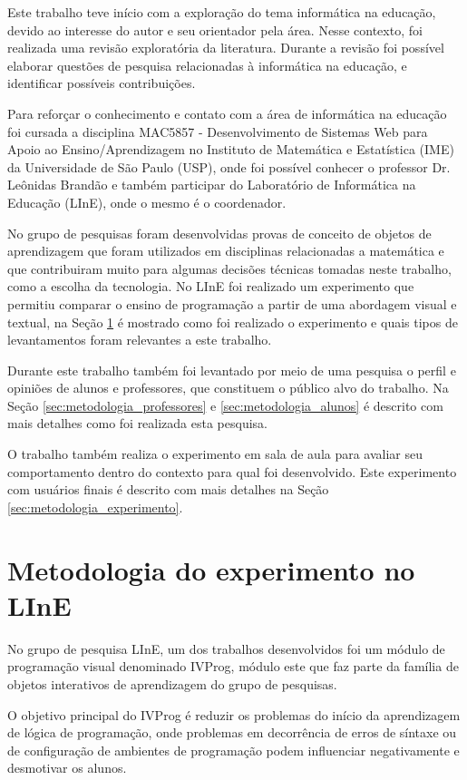 Este trabalho teve início com a exploração do tema informática na educação, devido ao interesse do autor e seu orientador pela área. Nesse contexto, foi realizada uma revisão exploratória da literatura. Durante a revisão foi possível elaborar questões de pesquisa relacionadas à informática na educação, e identificar possíveis contribuições.

Para reforçar o conhecimento e contato com a área de informática na educação foi cursada a disciplina MAC5857 - Desenvolvimento de Sistemas Web para Apoio ao Ensino/Aprendizagem no Instituto de Matemática e Estatística (IME) da Universidade de São Paulo (USP), onde foi possível conhecer o professor Dr. Leônidas Brandão e também participar do Laboratório de Informática na Educação (LInE), onde o mesmo é o coordenador.

No grupo de pesquisas foram desenvolvidas provas de conceito de objetos de aprendizagem que foram utilizados em disciplinas relacionadas a matemática e que contribuiram muito para algumas decisões técnicas tomadas neste trabalho, como a escolha da tecnologia. No LInE foi realizado um experimento que permitiu comparar o ensino de programação a partir de uma abordagem visual e textual, na Seção \ref{sec:metodologia_line} é mostrado como foi realizado o experimento e quais tipos de levantamentos foram relevantes a este trabalho.

Durante este trabalho também foi levantado por meio de uma pesquisa o perfil e opiniões de alunos e professores, que constituem o público alvo do trabalho. Na Seção \ref{sec:metodologia_professores} e \ref{sec:metodologia_alunos} é descrito com mais detalhes como foi realizada esta pesquisa.

O trabalho também realiza o experimento em sala de aula para avaliar seu comportamento dentro do contexto para qual foi desenvolvido. Este experimento com usuários finais é descrito com mais detalhes na Seção \ref{sec:metodologia_experimento}.

\section{Metodologia do experimento no LInE}
\label{sec:metodologia_line}

No grupo de pesquisa LInE, um dos trabalhos desenvolvidos foi um módulo de programação visual denominado IVProg, módulo este que faz parte da família de objetos interativos de aprendizagem do grupo de pesquisas.


O objetivo principal do IVProg é reduzir os problemas do início da aprendizagem de lógica de programação, onde problemas em decorrência de erros de síntaxe ou de configuração de ambientes de programação podem influenciar negativamente e desmotivar os alunos.

